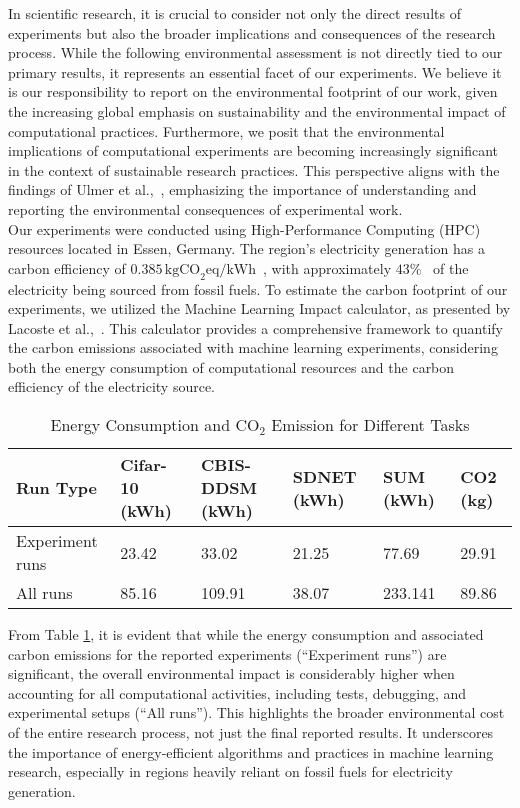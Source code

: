 
In scientific research, it is crucial to consider not only the direct results of experiments but also the broader implications and consequences of the research process. While the following environmental assessment is not directly tied to our primary results, it represents an essential facet of our experiments. We believe it is our responsibility to report on the environmental footprint of our work, given the increasing global emphasis on sustainability and the environmental impact of computational practices. Furthermore, we posit that the environmental implications of computational experiments are becoming increasingly significant in the context of sustainable research practices. This perspective aligns with the findings of Ulmer et al.,~\cite{ulmer-etal-2022-experimental}, emphasizing the importance of understanding and reporting the environmental consequences of experimental work.\\

Our experiments were conducted using High-Performance Computing (HPC) resources located in Essen, Germany. The region's electricity generation has a carbon efficiency of \(0.385 \, \text{kgCO}_2\text{eq/kWh}\)~\cite{ourworldindata2023}, with approximately \(43\%\)~\cite{statista2022energy} of the electricity being sourced from fossil fuels. To estimate the carbon footprint of our experiments, we utilized the Machine Learning Impact calculator, as presented by Lacoste et al.,~\cite{DBLP:journals/corr/abs-1910-09700}. This calculator provides a comprehensive framework to quantify the carbon emissions associated with machine learning experiments, considering both the energy consumption of computational resources and the carbon efficiency of the electricity source.

\begin{table}[htbp]
    \centering
    \caption{Energy Consumption and \(\text{CO}_2\) Emission for Different Tasks}
    \label{tab:energy_consumption}
    \begin{tabularx}{\textwidth}{lXXXXX}
        \toprule
        Run Type & Cifar-10 (kWh) & CBIS-DDSM (kWh) & SDNET (kWh) & SUM (kWh) & CO2 (kg) \\
        \midrule
        Experiment runs & 23.42 & 33.02 & 21.25 & 77.69 & 29.91 \\
        All runs & 85.16 & 109.91 & 38.07 & 233.141 & 89.86 \\
        \bottomrule
    \end{tabularx}
  \end{table}
  

From Table \ref{tab:energy_consumption}, it is evident that while the energy consumption and associated carbon emissions for the reported experiments (``Experiment runs'') are significant, the overall environmental impact is considerably higher when accounting for all computational activities, including tests, debugging, and experimental setups (``All runs''). This highlights the broader environmental cost of the entire research process, not just the final reported results. It underscores the importance of energy-efficient algorithms and practices in machine learning research, especially in regions heavily reliant on fossil fuels for electricity generation.
